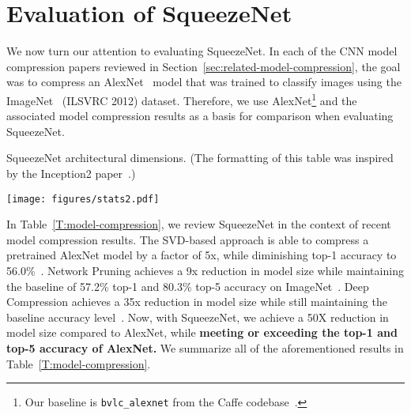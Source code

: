 \documentclass{article} \usepackage{iclr2017_conference,times}
\renewcommand{\cite}{\citep}
\def\vsp{\vspace{-0.15in}}
\begin{document}
\section{Evaluation of SqueezeNet}
\label{sec:eval-squeezenet}
\vsp

We now turn our attention to evaluating SqueezeNet.
In each of the CNN model compression papers reviewed in Section~\ref{sec:related-model-compression}, the goal was to compress an AlexNet~\cite{alexnet} model that was trained to classify images using the ImageNet~\cite{imagenet} (ILSVRC 2012) dataset.
Therefore, we use AlexNet\footnote{Our baseline is {\tt bvlc\_alexnet} from the Caffe codebase~\cite{jia2014caffe}.} and the associated model compression results as a basis for comparison when evaluating SqueezeNet.

\begin{table}[htb]
	\centering
	\caption[SqueezeNet architectural dimensions]{SqueezeNet architectural dimensions. (The formatting of this table was inspired by the Inception2 paper~\cite{googleBN}.)}
	\label{T:SqueezeNet-dims}
	\texttt{[image: figures/stats2.pdf]}
\end{table}


In Table~\ref{T:model-compression}, we review SqueezeNet in the context of recent model compression results.
The SVD-based approach is able to compress a pretrained AlexNet model by a factor of 5x, while diminishing top-1 accuracy to 56.0\%~\cite{facebook-compress-2014}.
Network Pruning achieves a 9x reduction in model size while maintaining the baseline of 57.2\% top-1 and 80.3\% top-5 accuracy on ImageNet~\cite{dally2015-1}.
Deep Compression achieves a 35x reduction in model size while still maintaining the baseline accuracy level~\cite{dally2015-2}.
Now, with SqueezeNet, we achieve a 50X reduction in model size compared to AlexNet, while {\bf meeting or exceeding the top-1 and top-5 accuracy of AlexNet.}
We summarize all of the aforementioned results in Table~\ref{T:model-compression}.
\end{document}
